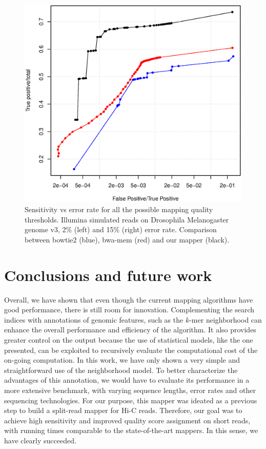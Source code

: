 \begin{figure}[h]
\begin{minipage}[b]{0.5\linewidth}
	  \includegraphics[width=\textwidth]{figures/chap4_dmel_5_15}
   \end{minipage}
   \caption{Sensitivity vs error rate for all the possible mapping
       quality thresholds. Illumina simulated reads on Drosophila
       Melanogaster genome v3, 2\% (left) and 15\% (right) error
       rate. Comparison between bowtie2 (blue), bwa-mem (red) and our
       mapper (black). } 

\end{figure}

\chapter{Conclusions and future work}

Overall, we have shown that even though the current mapping algorithms
have good performance, there is still room for
innovation. Complementing the search indices with annotations of 
genomic features, such as the $k$-mer neighborhood can enhance the
overall performance and efficiency of the algorithm. It also provides
greater control on the output because the use of statistical models,
like the one presented, can be exploited to recursively evaluate the
computational cost of the on-going computation. In this work, we have
only shown a very simple and straightforward use of the neighborhood
model. To better characterize the advantages of this annotation, we
would have to evaluate its performance in a more extensive benchmark,
with varying sequence lengths, error rates and other sequencing
technologies. For our purpose, this mapper was ideated as a previous
step to build a split-read mapper for Hi-C reads. Therefore, our goal
was to achieve high sensitivity and improved quality score assignment on
short reads, with running times comparable to the state-of-the-art
mappers. In this sense, we have clearly succeeded.

